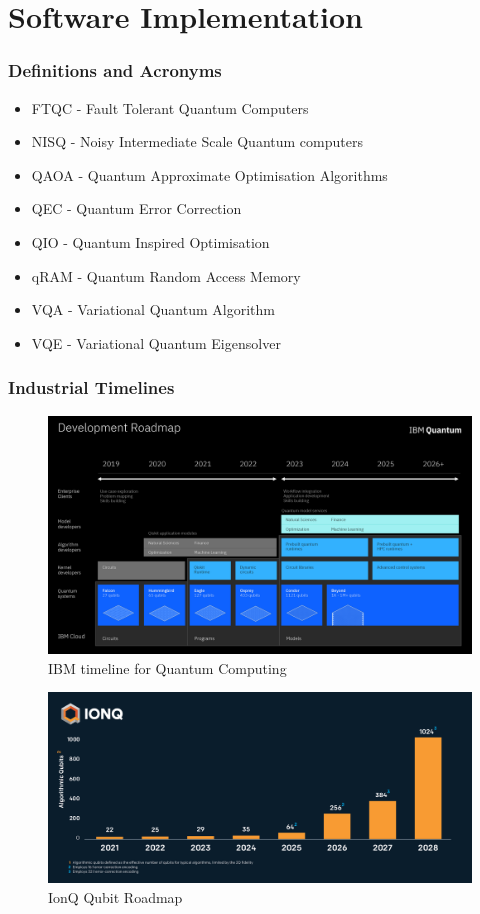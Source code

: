 \documentclass{article}
\theoremstyle{definition}
\begin{document}
\clearpage
\part{Software Implementation}

\clearpage
\printbibliography
\clearpage

\appendix 
\section{Definitions and Acronyms}
\begin{itemize}
    \item FTQC - Fault Tolerant Quantum Computers
    \item NISQ - Noisy Intermediate Scale Quantum computers
    \item QAOA - Quantum Approximate Optimisation Algorithms
    \item QEC - Quantum Error Correction
    \item QIO - Quantum Inspired Optimisation
    \item qRAM - Quantum Random Access Memory
    \item VQA - Variational Quantum Algorithm
    \item VQE - Variational Quantum Eigensolver

\end{itemize}
\section{Industrial Timelines}
\begin{figure}[htb]
    \centering
    \includegraphics[scale=0.1]{50863431103_aa832db592_o.jpg}
    \caption{IBM timeline for Quantum Computing \cite{wehden_faro_gambetta_2021} }
    \label{fig:ibm_timeline}
\end{figure}

\begin{figure}[htb]
    \centering
    \includegraphics[scale=0.1]{IonQ-roadmap-20201208.jpg}
    \caption{IonQ Qubit Roadmap}
    \label{fig:IonW_timeline}
\end{figure}
\end{document}
